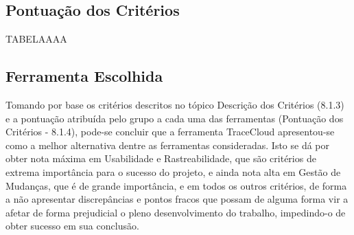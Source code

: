 \subsection{Pontuação dos Critérios}

TABELAAAA


\subsection{Ferramenta Escolhida}

Tomando por base os critérios descritos no tópico Descrição dos Critérios (8.1.3) e a pontuação atribuída pelo grupo a cada uma das ferramentas (Pontuação dos Critérios - 8.1.4), pode-se concluir que a ferramenta TraceCloud apresentou-se como a melhor alternativa dentre as ferramentas consideradas. Isto se dá por obter nota máxima em Usabilidade e Rastreabilidade, que são critérios de extrema importância para o sucesso do projeto, e ainda nota alta em Gestão de Mudanças, que é de grande importância, e em todos os outros critérios, de forma a não apresentar discrepâncias e pontos fracos que possam de alguma forma vir a afetar de forma prejudicial o pleno desenvolvimento do trabalho, impedindo-o de obter sucesso em sua conclusão. 
